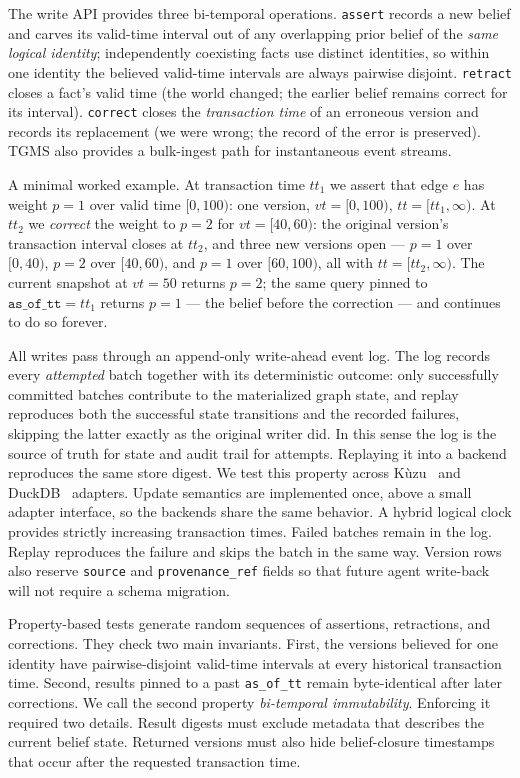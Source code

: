 \documentclass[11pt]{article}
\begin{document}
The write API provides three bi-temporal operations. \texttt{assert}
records a new belief and carves its valid-time interval out of any
overlapping prior belief of the \emph{same logical identity};
independently coexisting facts use distinct identities, so within one
identity the believed valid-time intervals are always pairwise
disjoint. \texttt{retract} closes a fact's valid time (the world
changed; the earlier belief remains correct for its interval).
\texttt{correct} closes the \emph{transaction time} of an erroneous
version and records its replacement (we were wrong; the record of the
error is preserved). TGMS also provides a bulk-ingest path for
instantaneous event streams.

A minimal worked example. At transaction time $tt_1$ we assert that
edge $e$ has weight $p{=}1$ over valid time $[0, 100)$: one version,
$vt{=}[0,100)$, $tt{=}[tt_1, \infty)$. At $tt_2$ we \emph{correct} the
weight to $p{=}2$ for $vt{=}[40, 60)$: the original version's
transaction interval closes at $tt_2$, and three new versions open ---
$p{=}1$ over $[0,40)$, $p{=}2$ over $[40,60)$, and $p{=}1$ over
$[60,100)$, all with $tt{=}[tt_2,\infty)$. The current snapshot at
$vt{=}50$ returns $p{=}2$; the same query pinned to
$\texttt{as\_of\_tt}{=}tt_1$ returns $p{=}1$ --- the belief before the
correction --- and continues to do so forever.

All writes pass through an append-only write-ahead event log. The log
records every \emph{attempted} batch together with its deterministic
outcome: only successfully committed batches contribute to the
materialized graph state, and replay reproduces both the successful
state transitions and the recorded failures, skipping the latter
exactly as the original writer did. In this sense the log is the source
of truth for state and audit trail for attempts. Replaying it into a
backend reproduces the same store digest. We test this property across K\`uzu~\cite{kuzu2023} and
DuckDB~\cite{duckdb2019} adapters. Update semantics are implemented once,
above a small adapter interface, so the backends share the same behavior.
A hybrid logical clock provides strictly increasing transaction times.
Failed batches remain in the log. Replay reproduces the failure and skips
the batch in the same way. Version rows also reserve
\texttt{source} and \texttt{provenance\_ref} fields so that future agent
write-back will not require a schema migration.

Property-based tests generate random sequences of assertions,
retractions, and corrections. They check two main invariants. First, the
versions believed for one identity have pairwise-disjoint valid-time
intervals at every historical transaction time. Second, results pinned to
a past \texttt{as\_of\_tt} remain byte-identical after later corrections.
We call the second property \emph{bi-temporal immutability}. Enforcing it
required two details. Result digests must exclude metadata that describes
the current belief state. Returned versions must also hide
belief-closure timestamps that occur after the requested transaction
time.
\end{document}
